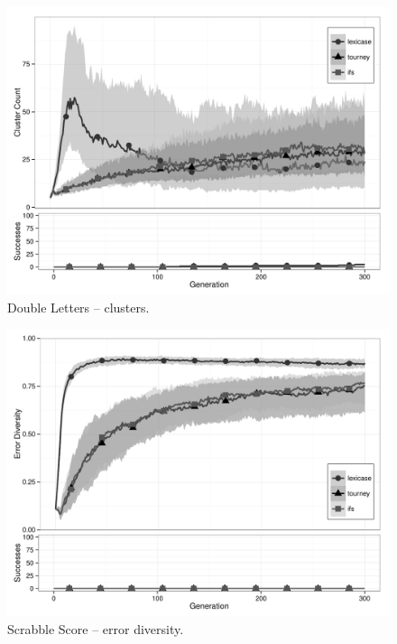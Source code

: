 \begin{figure}[p] %
\centering
\includegraphics[width=11.5cm]{double-letters-cluster.pdf}
\caption{Double Letters -- clusters.}
\label{double-lettersClu}
\end{figure}

\begin{figure}[p] %
\centering
\includegraphics[width=11.5cm]{scrabble-score-diversity.pdf}
\caption{Scrabble Score -- error diversity.}
\label{scrabble-scoreDiv}
\end{figure}

